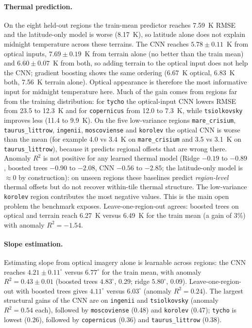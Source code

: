 \documentclass[10pt]{article}
\begin{document}
\paragraph{Thermal prediction.}
On the eight held-out regions the train-mean predictor reaches 7.59~K RMSE and
the latitude-only model is worse (8.17~K), so latitude alone does not explain
midnight temperature across these terrains. The CNN reaches $5.78\pm0.11$~K
from optical inputs, $7.69\pm0.19$~K from terrain alone (no better than the
train mean) and $6.60\pm0.07$~K from both, so adding terrain to the optical
input does not help the CNN; gradient boosting shows the same ordering
(6.67~K optical, 6.83~K both, 7.56~K terrain alone). Optical appearance is
therefore the most informative input for midnight temperature here. Much of the
gain comes from regions far from the training distribution: for \texttt{tycho}
the optical-input CNN lowers RMSE from 23.5 to 12.3~K and for
\texttt{copernicus} from 12.0 to 7.3~K, while \texttt{tsiolkovsky} improves
less (11.4 to 9.9~K). On the five low-variance regions
\texttt{mare\_crisium}, \texttt{taurus\_littrow}, \texttt{ingenii},
\texttt{moscoviense} and \texttt{korolev} the optical CNN is worse than the
mean (for example 4.0 vs 3.4~K on \texttt{mare\_crisium} and 3.5 vs 3.1~K on
\texttt{taurus\_littrow}), because it predicts regional offsets that are wrong
there. Anomaly $R^2$ is not positive for any learned thermal model (Ridge
$-0.19$ to $-0.89$, boosted trees $-0.90$ to $-2.08$, CNN $-0.56$ to $-2.85$;
the latitude-only model is $\approx 0$ by construction): on unseen regions these
baselines predict \emph{region-level} thermal offsets but do not recover
within-tile thermal structure. The low-variance \texttt{korolev} region
contributes the most negative values. This is the main open problem the
benchmark exposes.
Leave-one-region-out agrees: boosted trees on optical and terrain reach
6.27~K versus 6.49~K for the train mean (a gain of 3\%) with anomaly
$R^2=-1.54$.

\paragraph{Slope estimation.}
Estimating slope from optical imagery alone is learnable across regions: the
CNN reaches $4.21\pm0.11^\circ$ versus $6.77^\circ$ for the train mean, with
anomaly $R^2=0.43\pm0.01$ (boosted trees $4.83^\circ$, 0.29; ridge
$5.80^\circ$, 0.09). Leave-one-region-out with boosted trees gives
$4.11^\circ$ versus $6.03^\circ$ (anomaly $R^2=0.24$). The largest structural
gains of the CNN are on \texttt{ingenii} and \texttt{tsiolkovsky} (anomaly
$R^2=0.54$ each), followed by \texttt{moscoviense} (0.48) and \texttt{korolev}
(0.47); \texttt{tycho} is lowest (0.26), followed by \texttt{copernicus}
(0.36) and \texttt{taurus\_littrow} (0.38).
\end{document}
